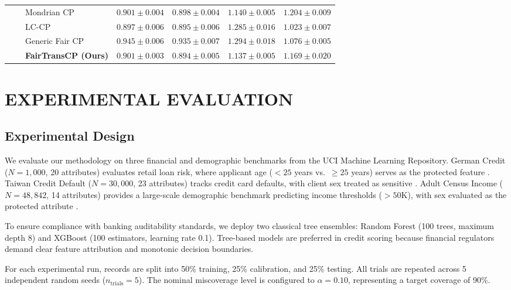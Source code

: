 \documentclass[twoside]{article}
\begin{document}
\begin{table}[t]
\begin{tabular}{lllcccc}
 &  & Mondrian CP & $0.901 \pm 0.004$ & $0.898 \pm 0.004$ & $1.140 \pm 0.005$ & $1.204 \pm 0.009$ \\
 &  & LC-CP & $0.897 \pm 0.006$ & $0.895 \pm 0.006$ & $1.285 \pm 0.016$ & $\mathbf{1.023 \pm 0.007}$ \\
 &  & Generic Fair CP & $0.945 \pm 0.006$ & $0.935 \pm 0.007$ & $1.294 \pm 0.018$ & $1.076 \pm 0.005$ \\
 &  & \textbf{FairTransCP (Ours)} & $0.901 \pm 0.003$ & $0.894 \pm 0.005$ & $1.137 \pm 0.005$ & $\mathbf{1.169 \pm 0.020}$ \\
\bottomrule
\end{tabular}
\end{table}

\section{EXPERIMENTAL EVALUATION}

\subsection{Experimental Design}
We evaluate our methodology on three financial and demographic benchmarks from the UCI Machine Learning Repository. German Credit ($N=1{,}000$, 20 attributes) evaluates retail loan risk, where applicant age ($<25$ years vs.\ $\ge 25$ years) serves as the protected feature \citep{hofmann1994german}. Taiwan Credit Default ($N=30{,}000$, 23 attributes) tracks credit card defaults, with client sex treated as sensitive \citep{yeh2009comparisons}. Adult Census Income ($N=48{,}842$, 14 attributes) provides a large-scale demographic benchmark predicting income thresholds ($>50\text{K}$), with sex evaluated as the protected attribute \citep{kohavi1996scaling}.

To ensure compliance with banking auditability standards, we deploy two classical tree ensembles: Random Forest \citep{breiman2001random} (100 trees, maximum depth 8) and XGBoost \citep{chen2016xgboost} (100 estimators, learning rate 0.1). Tree-based models are preferred in credit scoring because financial regulators demand clear feature attribution and monotonic decision boundaries.

For each experimental run, records are split into 50\% training, 25\% calibration, and 25\% testing. All trials are repeated across 5 independent random seeds ($n_{\text{trials}}=5$). The nominal miscoverage level is configured to $\alpha = 0.10$, representing a target coverage of 90\%.
\end{document}
